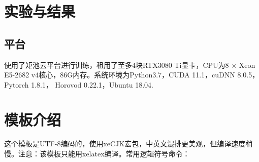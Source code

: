 \documentclass[UTF8,12pt]{article} %
\theoremstyle{definition}
\begin{document}
\section{实验与结果}
\subsection{平台}
使用了矩池云平台进行训练，租用了至多4块RTX3080 Ti显卡，CPU为8 $\times$ Xeon E5-2682 v4核心，86G内存。系统环境为Python3.7，CUDA 11.1，cuDNN 8.0.5，Pytorch 1.8.1， Horovod 0.22.1，Ubuntu 18.04.



\section{模板介绍}
这个模板是UTF-8编码的，使用xeCJK宏包，中英文混排更美观，但编译速度稍慢。注意：该模板只能用xelatex编译。常用逻辑符号命令：
\end{document}
